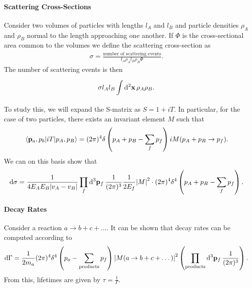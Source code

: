 \paragraph{Scattering Cross-Sections}
Consider two volumes of particles with lengths $l_{A}$ and $l_{B}$ and particle densities $\rho_{A}$ and $\rho_{B}$ normal to the length approaching one another. If $\Phi$ is the cross-sectional area common to the volumes we define the scattering cross-section as
\begin{align*}
	\sigma = \frac{\text{number of scattering events}}{l_{A}\rho_{A}l_{B}\rho_{B}\Phi}.
\end{align*}
The number of scattering events is then
\begin{align*}
	\sigma l_{A}l_{B}\int\limits_{}^{}\dd[2]{\vb{x}}\rho_{A}\rho_{B}.
\end{align*}
To study this, we will expand the S-matrix as $S = 1 + iT$. In particular, for the case of two particles, there exists an invariant element $M$ such that
\begin{align*}
	\mel{\vb{p}_{a}, p_{b}}{iT}{p_{A}, p_{B}} = (2\pi)^{4}\delta\left(p_{A} + p_{B} - \sum\limits_{f}p_{f}\right)iM(p_{A} + p_{B} \to p_{f}).
\end{align*}
We can on this basis show that
\begin{align*}
	\dd{\sigma} = \frac{1}{4E_{A}E_{B}\abs{v_{A} - v_{B}}}\prod\limits_{f}\dd[3]{\vb{p}_{f}}\frac{1}{(2\pi)^{3}}\frac{1}{2E_{f}}\abs{M}^{2}\cdot (2\pi)^{4}\delta^{4}\left(p_{A} + p_{B} - \sum\limits_{f}p_{f}\right).
\end{align*}

\paragraph{Decay Rates}
Consider a reaction $a\to b + c + \dots$. It can be shown that decay rates can be computed according to
\begin{align*}
	\dd{\Gamma} = \frac{1}{2m_{a}}(2\pi)^{4}\delta^{4}\left(p_{a} - \sum\limits_{\text{products}}p_{f}\right)\abs{M(a \to b + c + \dots)}^{2}\left(\prod\limits_{\text{products}}\dd[3]{\vb{p}_{f}}\frac{1}{(2\pi)^{3}}\right).
\end{align*}
From this, lifetimes are given by $\tau = \frac{1}{\Gamma}$.